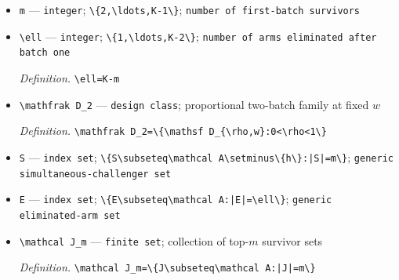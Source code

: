 \documentclass{article}
\begin{document}
\begin{itemize}
  \item \texttt{m} --- \texttt{integer}; \texttt{\textbackslash{}\allowbreak{}\{2,\allowbreak{}\textbackslash{}\allowbreak{}ldots,\allowbreak{}K-\allowbreak{}1\textbackslash{}\allowbreak{}\}\allowbreak{}}; \texttt{number of first-\allowbreak{}batch survivors}
  \item \texttt{\textbackslash{}\allowbreak{}ell} --- \texttt{integer}; \texttt{\textbackslash{}\allowbreak{}\{1,\allowbreak{}\textbackslash{}\allowbreak{}ldots,\allowbreak{}K-\allowbreak{}2\textbackslash{}\allowbreak{}\}\allowbreak{}}; \texttt{number of arms eliminated after batch one}
  \par\smallskip\noindent\emph{Definition.} \texttt{\textbackslash{}\allowbreak{}ell=\allowbreak{}K-\allowbreak{}m}
  \item \texttt{\textbackslash{}\allowbreak{}mathfrak D\_\allowbreak{}2} --- \texttt{design class}; proportional two-batch family at fixed \(w\)
  \par\smallskip\noindent\emph{Definition.} \texttt{\textbackslash{}\allowbreak{}mathfrak D\_\allowbreak{}2=\allowbreak{}\textbackslash{}\allowbreak{}\{\textbackslash{}\allowbreak{}mathsf D\_\allowbreak{}\{\textbackslash{}\allowbreak{}rho,\allowbreak{}w\}\allowbreak{}:\allowbreak{}0<\textbackslash{}\allowbreak{}rho<1\textbackslash{}\allowbreak{}\}\allowbreak{}}
  \item \texttt{S} --- \texttt{index set}; \texttt{\textbackslash{}\allowbreak{}\{S\textbackslash{}\allowbreak{}subseteq\textbackslash{}\allowbreak{}mathcal A\textbackslash{}\allowbreak{}setminus\textbackslash{}\allowbreak{}\{h\textbackslash{}\allowbreak{}\}\allowbreak{}:\allowbreak{}|S|=\allowbreak{}m\textbackslash{}\allowbreak{}\}\allowbreak{}}; \texttt{generic simultaneous-\allowbreak{}challenger set}
  \item \texttt{E} --- \texttt{index set}; \texttt{\textbackslash{}\allowbreak{}\{E\textbackslash{}\allowbreak{}subseteq\textbackslash{}\allowbreak{}mathcal A:\allowbreak{}|E|=\allowbreak{}\textbackslash{}\allowbreak{}ell\textbackslash{}\allowbreak{}\}\allowbreak{}}; \texttt{generic eliminated-\allowbreak{}arm set}
  \item \texttt{\textbackslash{}\allowbreak{}mathcal J\_\allowbreak{}m} --- \texttt{finite set}; collection of top-\(m\) survivor sets
  \par\smallskip\noindent\emph{Definition.} \texttt{\textbackslash{}\allowbreak{}mathcal J\_\allowbreak{}m=\allowbreak{}\textbackslash{}\allowbreak{}\{J\textbackslash{}\allowbreak{}subseteq\textbackslash{}\allowbreak{}mathcal A:\allowbreak{}|J|=\allowbreak{}m\textbackslash{}\allowbreak{}\}\allowbreak{}}

\end{itemize}
\end{document}
